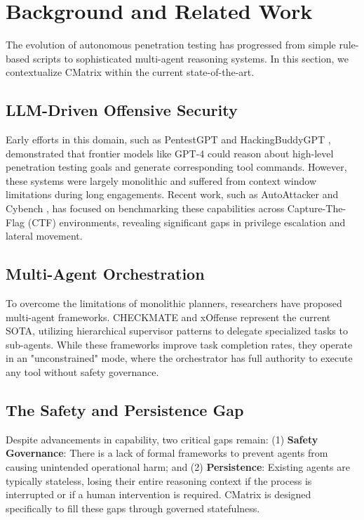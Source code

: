 \section{Background and Related Work}
\label{sec:background}

The evolution of autonomous penetration testing has progressed from simple rule-based scripts to sophisticated multi-agent reasoning systems. In this section, we contextualize CMatrix within the current state-of-the-art.

\subsection{LLM-Driven Offensive Security}
Early efforts in this domain, such as PentestGPT \cite{pentestgpt} and HackingBuddyGPT \cite{hackingbuddygpt}, demonstrated that frontier models like GPT-4 could reason about high-level penetration testing goals and generate corresponding tool commands. However, these systems were largely monolithic and suffered from context window limitations during long engagements. Recent work, such as AutoAttacker \cite{autoattacker} and Cybench \cite{cybench}, has focused on benchmarking these capabilities across Capture-The-Flag (CTF) environments, revealing significant gaps in privilege escalation and lateral movement.

\subsection{Multi-Agent Orchestration}
To overcome the limitations of monolithic planners, researchers have proposed multi-agent frameworks. CHECKMATE \cite{checkmate2025} and xOffense \cite{xoffense2025} represent the current SOTA, utilizing hierarchical supervisor patterns to delegate specialized tasks to sub-agents. While these frameworks improve task completion rates, they operate in an "unconstrained" mode, where the orchestrator has full authority to execute any tool without safety governance.

\subsection{The Safety and Persistence Gap}
Despite advancements in capability, two critical gaps remain: (1) \textbf{Safety Governance}: There is a lack of formal frameworks to prevent agents from causing unintended operational harm; and (2) \textbf{Persistence}: Existing agents are typically stateless, losing their entire reasoning context if the process is interrupted or if a human intervention is required. CMatrix is designed specifically to fill these gaps through governed statefulness.


